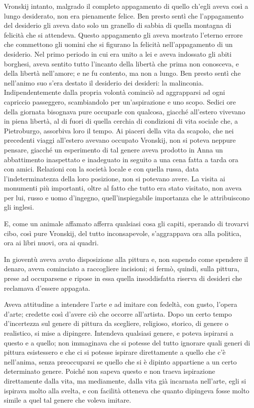 Vronskij intanto, malgrado il completo appagamento di quello ch'egli aveva così a lungo desiderato, non era pienamente felice. Ben presto sentì che l'appagamento del desiderio gli aveva dato solo un granello di sabbia di quella montagna di felicità che si attendeva. Questo appagamento gli aveva mostrato l'eterno errore che commettono gli uomini che si figurano la felicità nell'appagamento di un desiderio. Nel primo periodo in cui era unito a lei e aveva indossato gli abiti borghesi, aveva sentito tutto l'incanto della libertà che prima non conosceva, e della libertà nell'amore; e ne fu contento, ma non a lungo. Ben presto sentì che nell'animo suo s'era destato il desiderio dei desideri: la malinconia. Indipendentemente dalla propria volontà cominciò ad aggrapparsi ad ogni capriccio passeggero, scambiandolo per un'aspirazione e uno scopo. Sedici ore della giornata bisognava pure occuparle con qualcosa, giacché all'estero vivevano in piena libertà, al di fuori di quella cerchia di condizioni di vita sociale che, a Pietroburgo, assorbiva loro il tempo. Ai piaceri della vita da scapolo, che nei precedenti viaggi all'estero avevano occupato Vronskij, non si poteva neppure pensare, giacché un esperimento di tal genere aveva prodotto in Anna un abbattimento inaspettato e inadeguato in seguito a una cena fatta a tarda ora con amici. Relazioni con la società locale e con quella russa, data l'indeterminatezza della loro posizione, non si potevano avere. La visita ai monumenti più importanti, oltre al fatto che tutto era stato visitato, non aveva per lui, russo e uomo d'ingegno, quell'inspiegabile importanza che le attribuiscono gli inglesi. 

E, come un animale affamato afferra qualsiasi cosa gli capiti, sperando di trovarvi cibo, così pure Vronskij, del tutto inconsapevole, s'aggrappava ora alla politica, ora ai libri nuovi, ora ai quadri. 

In gioventù aveva avuto disposizione alla pittura e, non sapendo come spendere il denaro, aveva cominciato a raccogliere incisioni; si fermò, quindi, sulla pittura, prese ad occuparsene e ripose in essa quella insoddisfatta riserva di desideri che reclamava d'essere appagata. 

Aveva attitudine a intendere l'arte e ad imitare con fedeltà, con gusto, l'opera d'arte; credette così d'avere ciò che occorre all'artista. Dopo un certo tempo d'incertezza sul genere di pittura da scegliere, religioso, storico, di genere o realistico, si mise a dipingere. Intendeva qualsiasi genere, e poteva ispirarsi a questo e a quello; non immaginava che si potesse del tutto ignorare quali generi di pittura esistessero e che ci si potesse ispirare direttamente a quello che c'è nell'anima, senza preoccuparsi se quello che si è dipinto appartiene a un certo determinato genere. Poiché non sapeva questo e non traeva ispirazione direttamente dalla vita, ma mediamente, dalla vita già incarnata nell'arte, egli si ispirava molto alla svelta, e con facilità otteneva che quanto dipingeva fosse molto simile a quel tal genere che voleva imitare. 

